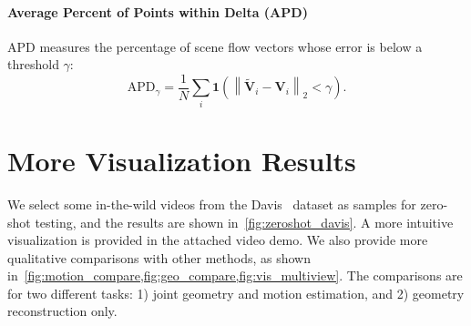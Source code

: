 \paragraph{Average Percent of Points within Delta (APD)}
APD measures the percentage of scene flow vectors whose error is below a threshold $\gamma$:
% 
\begin{equation}
\mathrm{APD}_\gamma =
\frac{1}{N}
\sum_i
\mathbf{1}
\left(
\left\|
\tilde{\mathbf{V}}_i - \mathbf{V}_i
\right\|_2 < \gamma
\right).
\end{equation}

\section{More Visualization Results}
\label{sec:more_vis}
% 

We select some in-the-wild videos from the Davis~\cite{Perazzi2016davis} dataset as samples for zero-shot testing, and the results are shown in~\cref{fig:zeroshot_davis}.
A more intuitive visualization is provided in the attached video demo.
We also provide more qualitative comparisons with other methods, as shown in~\cref{fig:motion_compare,fig:geo_compare,fig:vis_multiview}.
The comparisons are for two different tasks: 1) joint geometry and motion estimation, and 2) geometry reconstruction only.

\clearpage






